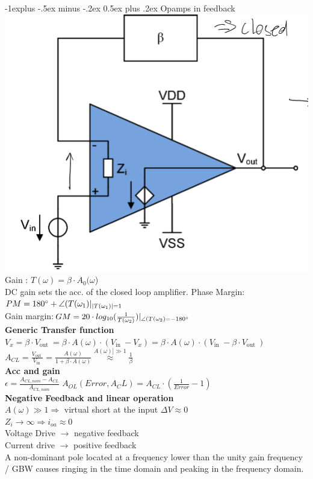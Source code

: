 \documentclass[5pt]{article}
\makeatletter
\renewcommand{\subsection}{\@startsection{subsection}{2}{0mm}%
                                {-1explus -.5ex minus -.2ex}%
                                {0.5ex plus .2ex}%
                                {\normalfont\normalsize\bfseries}}
\makeatother
\begin{document}
\begin{multicols*}{4}
\subsection{Opamps in feedback}
\includegraphics[width =0.7\columnwidth]{images/opampfeedbacl.png}\\
Gain : $ T(\omega) =\beta \cdot A_0 (\omega $) \\
DC gain sets the acc. of the closed loop amplifier.
Phase Margin: $PM =180 \degree + \angle (T(\omega_1)|_{  |T(\omega_1)| = 1 } $\\
Gain margin:$ GM = 20 \cdot log_{10} (\frac{1}{T(\omega_2)})|_{\angle (T(\omega_2) = - 180 \degree  }$\\
\textbf{Generic Transfer function}\\
$  V_{x}=\beta \cdot V_{\text {out }}=\beta \cdot A(\omega) \cdot\left(V_{\text {in }}-V_{x}\right)=\beta \cdot A(\omega) \cdot\left(V_{\text {in }}-\beta \cdot V_{\text {out }}\right)$\\
$ A_{CL} =\frac{V_{\text {out }}}{V_{\text {in }}}=\frac{A(\omega)}{1+\beta \cdot A(\omega)} \stackrel{A(\omega)] \gg 1}{\approx} \frac{1}{\beta} $\\
\textbf{Acc and gain}\\
$ \epsilon = \frac{A_{CL,nom}-A_{CL}}{A_{CL,nom}} $
$ A_{OL}(Error, A_CL) = A_{CL} \cdot (\frac{1}{Error} -1)$\\
\textbf{Negative Feedback and linear operation}\\
$ A(\omega) \gg 1 \Rightarrow $ virtual short at the input $ \Delta V \approx 0  $ \\
$ Z_i \rightarrow \infty \Rightarrow i_{oa} \approx 0 $ \\
 Voltage Drive $ \rightarrow $ negative feedback\\
 Current drive $ \rightarrow $ positive feedback\\
 A non-dominant pole located at a frequency lower than the unity gain frequency / GBW causes ringing in the time domain and peaking in the frequency domain.

\end{multicols*}
\end{document}
